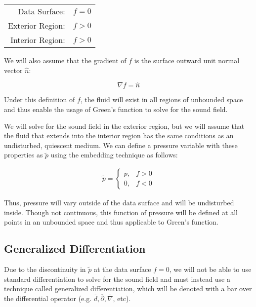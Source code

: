\documentclass[]{aiaa-tc}%
\begin{document}
\begin{center}
\begin{tabular}{| r  l |}
  \hline
  Data Surface:    & $f=0$ \\
  Exterior Region: & $f>0$ \\
  Interior Region: & $f>0$ \\
  \hline
\end{tabular}
\end{center}

\noindent We will also assume that the gradient of $f$ is the surface outward unit normal vector $\hat{n}$:

\begin{equation} \label{Gradfnormal}
\nabla f = \hat{n}
\end{equation}

Under this definition of $f$, the fluid will exist in all regions of unbounded space and thus enable the usage of Green's function to solve for the sound field.

We will solve for the sound field in the exterior region, but we will assume that the fluid that extends into the interior region has the same conditions as an undisturbed, quiescent medium.  We can define a pressure variable with these properties as $\widetilde{p}$ using the embedding technique as follows:

\begin{equation} \label{Ptilde}
\begin{split}
\boxed{\widetilde{p} =
    \left\{ \begin{array}{lll}
        p, & f > 0 \\
        0, & f < 0
    \end{array} \right.}
\end{split}
\end{equation}

\noindent Thus, pressure will vary outside of the data surface and will be undisturbed inside. Though not continuous, this function of pressure will be defined at all points in an unbounded space and thus applicable to Green's function.




\subsection{Generalized Differentiation}

Due to the discontinuity in $\widetilde{p}$ at the data surface $f=0$, we will not be able to use standard differentiation to solve for the sound field and must instead use a technique called generalized differentiation, which will be denoted with a bar over the differential operator (e.g. $\overline{d}, \overline{\partial}, \overline{\nabla}$, etc).
\end{document}
